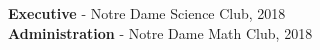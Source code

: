 
\vspace{2mm}

 \textbf{Executive} - Notre Dame Science Club, 2018 \\
 \vspace{1mm}
 \textbf{Administration} - Notre Dame Math Club, 2018 \\
 \vspace{1mm}

\vspace{5mm}